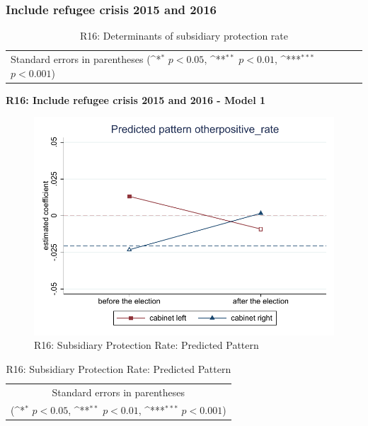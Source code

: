 \documentclass[10pt,a4paper]{scrartcl}
\begin{document}
\clearpage
\FloatBarrier
\subsubsection{Include refugee crisis 2015 and 2016}
\begin{table}[!ht]\centering
	\renewcommand{\arraystretch}{1.25}
	\small
	\def\sym#1{\ifmmode^{#1}\else\(^{#1}\)\fi}
	\caption{R16: Determinants of subsidiary protection rate}
	\begin{tabular}{l*{3}{c}}
		\hline\hline
		
		\hline\hline
		\multicolumn{4}{l}{\footnotesize Standard errors in parentheses (\sym{*} \(p<0.05\), \sym{**} \(p<0.01\), \sym{***} \(p<0.001\))}\\
	\end{tabular}
\end{table}

\clearpage
\textbf{R16: Include refugee crisis 2015 and 2016 - Model 1}
\begin{figure}[!ht]
	\centering
	\includegraphics[width=1\textwidth]{figures_edited/otherpositive_rate_graph1_R16.pdf}
	\caption{R16: Subsidiary Protection Rate: Predicted Pattern}
\end{figure}

\begin{table}[!ht]\centering
	\renewcommand{\arraystretch}{1.25}
	\def\sym#1{\ifmmode^{#1}\else\(^{#1}\)\fi}
	\caption{R16: Subsidiary Protection Rate: Predicted Pattern}
	\begin{tabular}{l*{2}{c}}
		\hline\hline
		
		\hline\hline
		\multicolumn{3}{c}{\footnotesize Standard errors in parentheses} \\
		\multicolumn{3}{c}{\footnotesize (\sym{*} \(p<0.05\), \sym{**} \(p<0.01\), \sym{***} \(p<0.001\))}\\
	\end{tabular}
\end{table}
\end{document}
